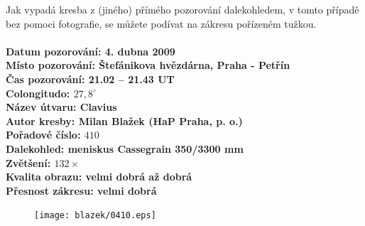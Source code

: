 \documentclass[10pt,a5paper,twoside]{book}
\begin{document}
Jak vypadá kresba z (jiného) přímého pozorování dalekohledem, v tomto případě bez pomoci fotografie, se můžete podívat na zákresu pořízeném tužkou.  \\
\newpage
\textbf{\\Datum pozorování: 4. dubna 2009\\
Místo pozorování: Štefánikova hvězdárna, Praha - Petřín \\
Čas pozorování: 21.02 – 21.43 UT\\
Colongitudo: $27,8 ^\circ$\\
Název útvaru: Clavius\\
Autor kresby: Milan Blažek (HaP Praha, p. o.)\\
Pořadové číslo: $410$\\
Dalekohled: meniskus Cassegrain 350/3300 mm\\
Zvětšení: $132\times$ \\
Kvalita obrazu: velmi dobrá až dobrá \\
Přesnost zákresu: velmi dobrá\\}

\begin{figure}[htbp]
	\begin{center}
		\texttt{[image: blazek/0410.eps]}
	\end{center}
\end{figure}
\newpage
\end{document}
